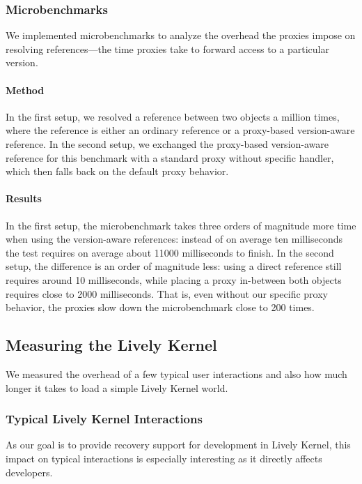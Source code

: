 \subsubsection{Microbenchmarks}

We implemented microbenchmarks to analyze the overhead the proxies impose on resolving references---the time proxies take to forward access to a particular version.

\paragraph{Method}
In the first setup, we resolved a reference between two objects a million times, where the reference is either an ordinary reference or a proxy-based version-aware reference.
In the second setup, we exchanged the proxy-based version-aware reference for this benchmark with a standard proxy without specific handler, which then falls back on the default proxy behavior.

\paragraph{Results}
In the first setup, the microbenchmark takes three orders of magnitude more time when using the version-aware references: instead of on average ten milliseconds the test requires on average about 11000 milliseconds to finish.
In the second setup, the difference is an order of magnitude less: using a direct reference still requires around 10 milliseconds, while placing a proxy in-between both objects requires close to 2000 milliseconds.
That is, even without our specific proxy behavior, the proxies slow down the microbenchmark close to 200 times.



\subsection{Measuring the Lively Kernel}

We measured the overhead of a few typical user interactions and also how much longer it takes to load a simple Lively Kernel world.

\subsubsection{Typical Lively Kernel Interactions}

As our goal is to provide recovery support for development in Lively Kernel, this impact on typical interactions is especially interesting as it directly affects developers.

